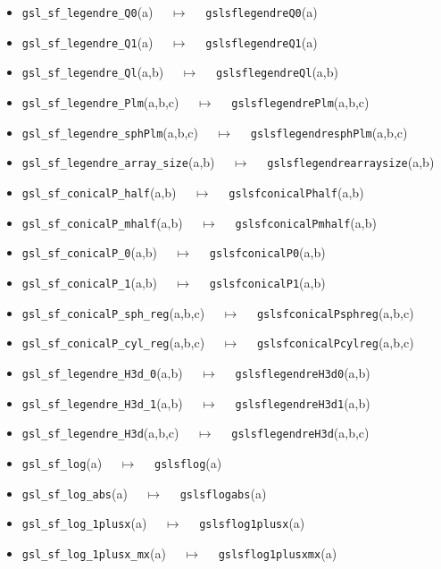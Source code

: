 \documentclass[a4paper,twoside,12pt]{book}
\begin{document}
{\begin{itemize}
\item \texttt{gsl\_sf\_legendre\_Q0}(a) $\quad \mapsto\quad $ \texttt{gslsflegendreQ0}(a) 
\item \texttt{gsl\_sf\_legendre\_Q1}(a) $\quad \mapsto\quad $ \texttt{gslsflegendreQ1}(a) 
\item \texttt{gsl\_sf\_legendre\_Ql}(a,b) $\quad \mapsto\quad $ \texttt{gslsflegendreQl}(a,b) 
\item \texttt{gsl\_sf\_legendre\_Plm}(a,b,c) $\quad \mapsto\quad $ \texttt{gslsflegendrePlm}(a,b,c) 
\item \texttt{gsl\_sf\_legendre\_sphPlm}(a,b,c) $\quad \mapsto\quad $ \texttt{gslsflegendresphPlm}(a,b,c) 
\item \texttt{gsl\_sf\_legendre\_array\_size}(a,b) $\quad \mapsto\quad $ \texttt{gslsflegendrearraysize}(a,b) 
\item \texttt{gsl\_sf\_conicalP\_half}(a,b) $\quad \mapsto\quad $ \texttt{gslsfconicalPhalf}(a,b) 
\item \texttt{gsl\_sf\_conicalP\_mhalf}(a,b) $\quad \mapsto\quad $ \texttt{gslsfconicalPmhalf}(a,b) 
\item \texttt{gsl\_sf\_conicalP\_0}(a,b) $\quad \mapsto\quad $ \texttt{gslsfconicalP0}(a,b) 
\item \texttt{gsl\_sf\_conicalP\_1}(a,b) $\quad \mapsto\quad $ \texttt{gslsfconicalP1}(a,b) 
\item \texttt{gsl\_sf\_conicalP\_sph\_reg}(a,b,c) $\quad \mapsto\quad $ \texttt{gslsfconicalPsphreg}(a,b,c) 
\item \texttt{gsl\_sf\_conicalP\_cyl\_reg}(a,b,c) $\quad \mapsto\quad $ \texttt{gslsfconicalPcylreg}(a,b,c) 
\item \texttt{gsl\_sf\_legendre\_H3d\_0}(a,b) $\quad \mapsto\quad $ \texttt{gslsflegendreH3d0}(a,b) 
\item \texttt{gsl\_sf\_legendre\_H3d\_1}(a,b) $\quad \mapsto\quad $ \texttt{gslsflegendreH3d1}(a,b) 
\item \texttt{gsl\_sf\_legendre\_H3d}(a,b,c) $\quad \mapsto\quad $ \texttt{gslsflegendreH3d}(a,b,c) 
\item \texttt{gsl\_sf\_log}(a) $\quad \mapsto\quad $ \texttt{gslsflog}(a) 
\item \texttt{gsl\_sf\_log\_abs}(a) $\quad \mapsto\quad $ \texttt{gslsflogabs}(a) 
\item \texttt{gsl\_sf\_log\_1plusx}(a) $\quad \mapsto\quad $ \texttt{gslsflog1plusx}(a) 
\item \texttt{gsl\_sf\_log\_1plusx\_mx}(a) $\quad \mapsto\quad $ \texttt{gslsflog1plusxmx}(a) 

\end{itemize}}
\end{document}
